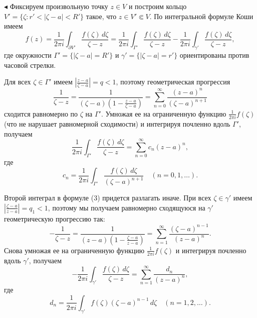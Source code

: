 \documentclass[12pt, a4paper]{article}
\theoremstyle{definition}
\theoremstyle{remark}
\begin{document}
$\blacktriangleleft$ Фиксируем произвольную точку $z \in V$ и построим кольцо $V' = \{\zeta : r' < |\zeta - a| < R'\}$ такое, что $z \in V' \Subset V$. По интегральной формуле Коши имеем
\begin{equation}
	f(z) = \frac{1}{2\pi i} \int_{\partial V'} \frac{f(\zeta) \, d\zeta}{\zeta - z} = \frac{1}{2\pi i} \int_{\Gamma'} \frac{f(\zeta) \, d\zeta}{\zeta - z} - \frac{1}{2\pi i} \int_{\gamma'} \frac{f(\zeta) \, d\zeta}{\zeta - z},
	\tag{3}
\end{equation}
где окружности $\Gamma' = \{|\zeta - a| = R'\}$ и $\gamma' = \{|\zeta - a| = r'\}$ ориентированы против часовой стрелки.

Для всех $\zeta \in \Gamma'$ имеем $\left| \frac{z - a}{\zeta - a} \right| = q < 1$, поэтому геометрическая прогрессия
$$
\frac{1}{\zeta - z} = \frac{1}{(\zeta - a)\left(1 - \frac{z - a}{\zeta - a}\right)} = \sum_{n=0}^{\infty} \frac{(z - a)^n}{(\zeta - a)^{n+1}}
$$
сходится равномерно по $\zeta$ на $\Gamma'$. Умножая ее на ограниченную функцию $\frac{1}{2\pi i} f(\zeta)$ (что не нарушает равномерной сходимости) и интегрируя почленно вдоль $\Gamma'$, получаем
\begin{equation}
	\frac{1}{2\pi i} \int_{\Gamma'} \frac{f(\zeta) \, d\zeta}{\zeta - z} = \sum_{n=0}^{\infty} c_n (z - a)^n,
	\tag{4}
\end{equation}
где
\begin{equation}
	c_n = \frac{1}{2\pi i} \int_{\Gamma'} \frac{f(\zeta) \, d\zeta}{(\zeta - a)^{n+1}} \quad (n = 0, 1, \dots).
	\tag{5}
\end{equation}

Второй интеграл в формуле (3) придется разлагать иначе. При всех $\zeta \in \gamma'$ имеем $\left| \frac{\zeta - a}{z - a} \right| = q_1 < 1$, поэтому мы получаем равномерно сходящуюся на $\gamma'$ геометрическую прогрессию так:
$$
-\frac{1}{\zeta - z} = \frac{1}{(z - a)\left(1 - \frac{\zeta - a}{z - a}\right)} = \sum_{n=1}^{\infty} \frac{(\zeta - a)^{n-1}}{(z - a)^n}.
$$
Снова умножая ее на ограниченную функцию $\frac{1}{2\pi i} f(\zeta)$ и интегрируя почленно вдоль $\gamma'$, получаем
\begin{equation}
	-\frac{1}{2\pi i} \int_{\gamma'} \frac{f(\zeta) \, d\zeta}{\zeta - z} = \sum_{n=1}^{\infty} \frac{d_n}{(z - a)^n},
	\tag{6}
\end{equation}
где
\begin{equation}
	d_n = \frac{1}{2\pi i} \int_{\gamma'} f(\zeta) (\zeta - a)^{n-1} \, d\zeta \quad (n = 1, 2, \dots).
	\tag{7}
\end{equation}
\end{document}
